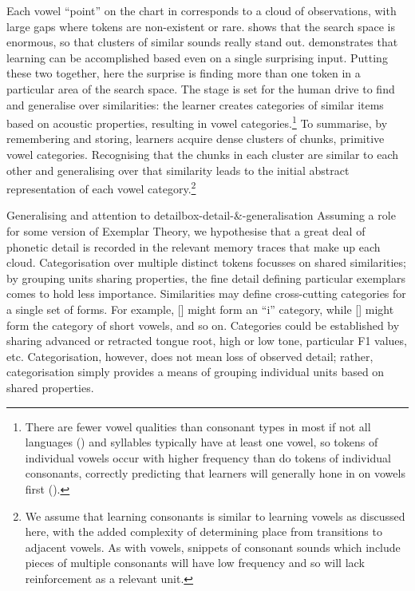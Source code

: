 Each vowel ``point'' on the chart in  corresponds to a cloud of observations, with large gaps where tokens are non-existent or rare. \citet{Lacerda:2003} shows that the search space is enormous, so that clusters of similar sounds really stand out.  \citet{Gerken+:2015} demonstrates that learning can be accomplished based even on a single surprising input. Putting these two together, here the surprise is finding more than one token in a particular area of the search space. The stage is set for  the human drive to find and generalise over similarities: the learner creates categories of similar items based on  acoustic properties, resulting in vowel categories.\footnote{There are fewer vowel qualities than consonant types in most if not all languages  (\citealt{Ladefoged+:1996}) and syllables typically have at least one vowel, so tokens of individual vowels occur with higher frequency than do tokens of individual consonants, correctly predicting that learners will generally hone in on vowels first (\citealt{Kuhl+:1992, Polka+:1994}).} To summarise, by remembering and storing, learners acquire dense clusters of chunks, primitive vowel categories. Recognising that the chunks in each cluster are similar to each other and generalising over that similarity leads to the initial abstract representation of each vowel category.\footnote{We assume that learning  consonants is similar to learning  vowels as discussed here, with the added complexity of determining place from transitions to adjacent vowels. As with vowels,  snippets of consonant sounds which include pieces of multiple consonants will have low frequency and so will lack reinforcement as a relevant unit.}

\begin{dadpbox}{Generalising and attention to detail}{box-detail-&-generalisation}
Assuming a role for some version of Exemplar Theory, we hypothesise that a great deal of phonetic detail is recorded in the relevant memory traces that make up each cloud.  Categorisation over multiple distinct tokens focusses on shared similarities; by grouping units sharing properties, the fine detail defining particular exemplars comes to hold less importance. Similarities may define cross-cutting categories for a single set of forms. For example, [] might form an ``i'' category, while [] might form the category of short vowels, and so on. Categories could be established by sharing advanced or retracted tongue root, high or low tone, particular F1 values, etc. Categorisation, however, does not mean loss of observed detail; rather, categorisation simply provides a means of grouping individual units based on shared properties.
\end{dadpbox}

